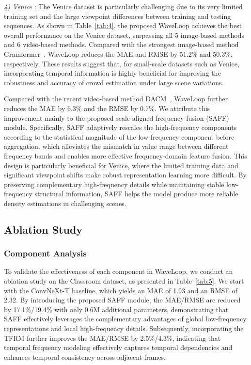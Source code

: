 \documentclass[lettersize,journal]{IEEEtran}
\begin{document}
\textit{4) Venice} \cite{liu2019context}:
The Venice dataset is particularly challenging due to its very limited training set and the large viewpoint differences between training and testing sequences. As shown in Table~\ref{tab:4}, the proposed WaveLoop achieves the best overall performance on the Venice dataset, surpassing all 5 image-based methods and 6 video-based methods. Compared with the strongest image-based method Gramformer~\cite{lin2024gramformer}, WaveLoop reduces the MAE and RMSE by 51.2\% and 50.3\%, respectively. These results suggest that, for small-scale datasets such as Venice, incorporating temporal information is highly beneficial for improving the robustness and accuracy of crowd estimation under large scene variations.

Compared with the recent video-based method DACM~\cite{ling2025dual}, WaveLoop further reduces the MAE by 6.3\% and the RMSE by 0.7\%. We attribute this improvement mainly to the proposed scale-aligned frequency fusion (SAFF) module. Specifically, SAFF adaptively rescales the high-frequency components according to the statistical magnitude of the low-frequency component before aggregation, which alleviates the mismatch in value range between different frequency bands and enables more effective frequency-domain feature fusion. This design is particularly beneficial for Venice, where the limited training data and significant viewpoint shifts make robust representation learning more difficult. By preserving complementary high-frequency details while maintaining stable low-frequency structural information, SAFF helps the model produce more reliable density estimations in challenging scenes.



\vspace{-1em}
\subsection{Ablation Study}
\subsubsection{Component Analysis}
\noindent
To validate the effectiveness of each component in WaveLoop, we conduct an ablation study on the Classroom dataset, as presented in Table~\ref{tab:5}. We start with the ConvNeXt-T baseline, which yields an MAE of 1.93 and an RMSE of 2.32. By introducing the proposed SAFF module, the MAE/RMSE are reduced by 17.1\%/19.4\% with only 0.6M additional parameters, demonstrating that SAFF effectively leverages the complementary advantages of global low-frequency representations and local high-frequency details. Subsequently, incorporating the TFRM further improves the MAE/RMSE by 2.5\%/4.3\%, indicating that temporal frequency modeling effectively captures temporal dependencies and enhances temporal consistency across adjacent frames. 
\end{document}
